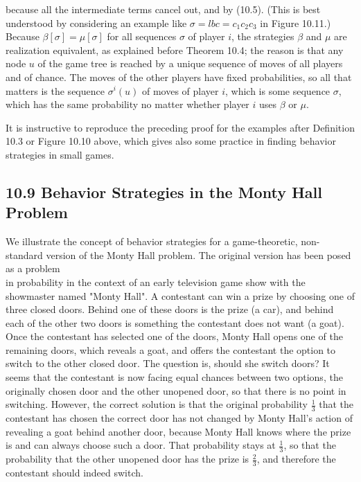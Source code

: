 \documentclass[12pt]{article}
\begin{document}
because all the intermediate terms cancel out, and by (10.5). (This is best understood by considering an example like $\sigma=l b c=c_{1} c_{2} c_{3}$ in Figure 10.11.) Because $\beta[\sigma]=\mu[\sigma]$ for all sequences $\sigma$ of player $i$, the strategies $\beta$ and $\mu$ are realization equivalent, as explained before Theorem 10.4; the reason is that any node $u$ of the game tree is reached by a unique sequence of moves of all players and of chance. The moves of the other players have fixed probabilities, so all that matters is the sequence $\sigma^{i}(u)$ of moves of player $i$, which is some sequence $\sigma$, which has the same probability no matter whether player $i$ uses $\beta$ or $\mu$.

It is instructive to reproduce the preceding proof for the examples after Definition 10.3 or Figure 10.10 above, which gives also some practice in finding behavior strategies in small games.

\subsection*{10.9 Behavior Strategies in the Monty Hall Problem}
We illustrate the concept of behavior strategies for a game-theoretic, non-standard version of the Monty Hall problem. The original version has been posed as a problem\\
in probability in the context of an early television game show with the showmaster named "Monty Hall". A contestant can win a prize by choosing one of three closed doors. Behind one of these doors is the prize (a car), and behind each of the other two doors is something the contestant does not want (a goat). Once the contestant has selected one of the doors, Monty Hall opens one of the remaining doors, which reveals a goat, and offers the contestant the option to switch to the other closed door. The question is, should she switch doors? It seems that the contestant is now facing equal chances between two options, the originally chosen door and the other unopened door, so that there is no point in switching. However, the correct solution is that the original probability $\frac{1}{3}$ that the contestant has chosen the correct door has not changed by Monty Hall's action of revealing a goat behind another door, because Monty Hall knows where the prize is and can always choose such a door. That probability stays at $\frac{1}{3}$, so that the probability that the other unopened door has the prize is $\frac{2}{3}$, and therefore the contestant should indeed switch.
\end{document}

